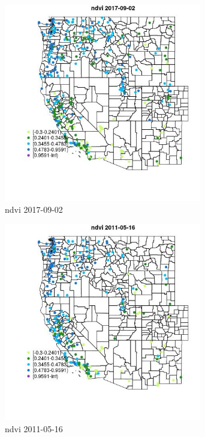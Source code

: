 \begin{figure} 
\centering  
\includegraphics[width=0.77\textwidth]{Code_Outputs/Report_ML_input_PM25_Step4_part_e_de_duplicated_aves_compiled_2019-05-20wNAs_MapObsndvi2017-09-02.jpg} 
\caption{\label{fig:Report_ML_input_PM25_Step4_part_e_de_duplicated_aves_compiled_2019-05-20wNAsMapObsndvi2017-09-02}ndvi 2017-09-02} 
\end{figure} 
 

\begin{figure} 
\centering  
\includegraphics[width=0.77\textwidth]{Code_Outputs/Report_ML_input_PM25_Step4_part_e_de_duplicated_aves_compiled_2019-05-20wNAs_MapObsndvi2011-05-16.jpg} 
\caption{\label{fig:Report_ML_input_PM25_Step4_part_e_de_duplicated_aves_compiled_2019-05-20wNAsMapObsndvi2011-05-16}ndvi 2011-05-16} 
\end{figure} 
 

